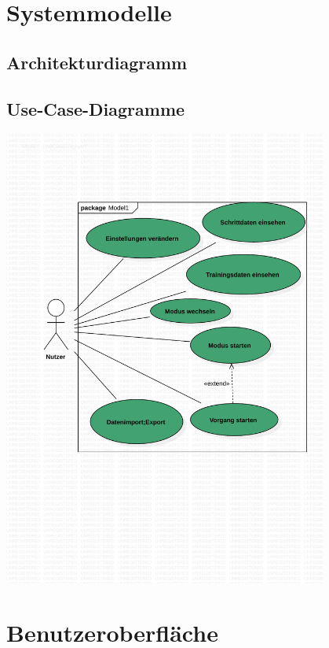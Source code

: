 \documentclass[a4paper,12pt]{article}
\begin{document}
\section{Systemmodelle}
  \subsection{Architekturdiagramm}
  \subsection{Use-Case-Diagramme}
\begin{center}
\includegraphics[width=0.8\textwidth]{Vorlaeufiges Use-Case Diagram.pdf} %
\end{center}
\section{Benutzeroberfläche}
\end{document}
